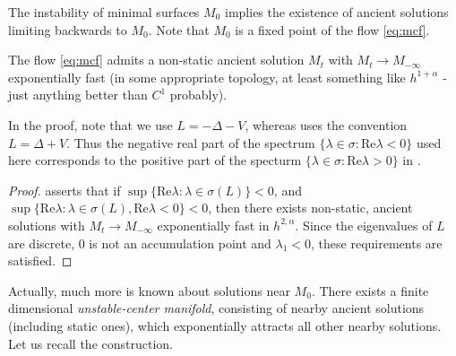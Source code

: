 \documentclass{amsart}
\begin{document}
The instability of minimal surfaces \(M_0\) implies the existence of ancient solutions limiting backwards to \(M_0\). Note that \(M_0\) is a fixed point of the flow \eqref{eq:mcf}.

\begin{thm}
\label{thm:ancient_existence}
The flow \eqref{eq:mcf} admits a non-static ancient solution \(M_t\) with \(M_t \to M_{-\infty}\) exponentially fast (in some appropriate topology, at least something like \(h^{1+\alpha}\) - just anything better than \(C^1\) probably).
\end{thm}

\begin{rem}
In the proof, note that we use \(L = -\Delta - V\), whereas \cite{lunardi2012analytic} uses the convention \(L = \Delta + V\). Thus the negative real part of the spectrum \(\{\lambda \in \sigma : \text{Re} \lambda < 0\}\) used here corresponds to the positive part of the specturm \(\{\lambda \in \sigma : \text{Re} \lambda > 0\}\) in \cite{lunardi2012analytic}.
\end{rem}

\begin{proof}
\cite[Theorem 9.1.3]{lunardi2012analytic} asserts that if \(\sup \{\text{Re}\lambda : \lambda \in \sigma(L)\} < 0\), and \(\sup\{\text{Re} \lambda : \lambda \in \sigma(L), \text{Re} \lambda < 0\} < 0\), then there exists non-static, ancient solutions with \(M_t \to M_{-\infty}\) exponentially fast in \(h^{2,\alpha}\). Since the eigenvalues of \(L\) are discrete, \(0\) is not an accumulation point and \(\lambda_1 < 0\), these requirements are satisfied.
\end{proof}

Actually, much more is known about solutions near \(M_0\). There exists a finite dimensional \emph{unstable-center manifold}, consisting of nearby ancient solutions (including static ones), which exponentially attracts all other nearby solutions. Let us recall the construction.
\end{document}
